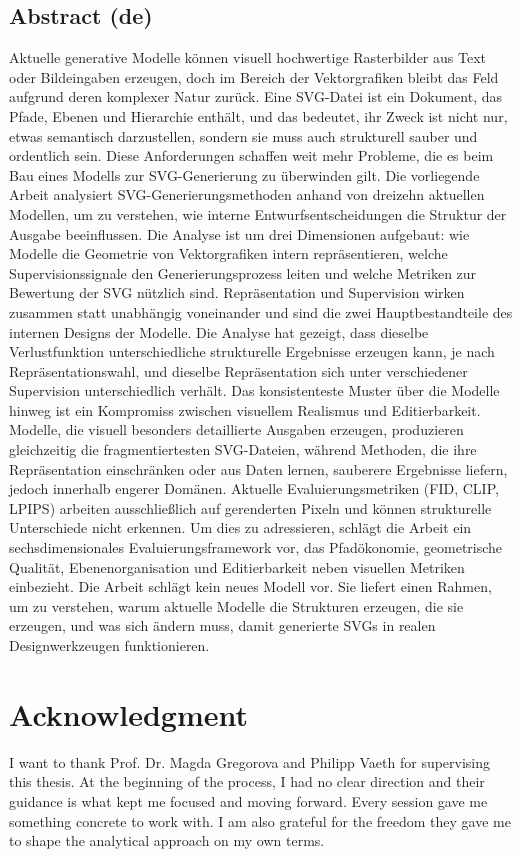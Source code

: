 \section*{Abstract (de)}
Aktuelle generative Modelle können visuell hochwertige Rasterbilder aus Text oder Bildeingaben erzeugen, doch im Bereich der Vektorgrafiken bleibt das Feld aufgrund deren komplexer Natur zurück. Eine SVG-Datei ist ein Dokument, das Pfade, Ebenen und Hierarchie enthält, und das bedeutet, ihr Zweck ist nicht nur, etwas semantisch darzustellen, sondern sie muss auch strukturell sauber und ordentlich sein. Diese Anforderungen schaffen weit mehr Probleme, die es beim Bau eines Modells zur SVG-Generierung zu überwinden gilt. Die vorliegende Arbeit analysiert SVG-Generierungsmethoden anhand von dreizehn aktuellen Modellen, um zu verstehen, wie interne Entwurfsentscheidungen die Struktur der Ausgabe beeinflussen. Die Analyse ist um drei Dimensionen aufgebaut: wie Modelle die Geometrie von Vektorgrafiken intern repräsentieren, welche Supervisionssignale den Generierungsprozess leiten und welche Metriken zur Bewertung der SVG nützlich sind. Repräsentation und Supervision wirken zusammen statt unabhängig voneinander und sind die zwei Hauptbestandteile des internen Designs der Modelle. Die Analyse hat gezeigt, dass dieselbe Verlustfunktion unterschiedliche strukturelle Ergebnisse erzeugen kann, je nach Repräsentationswahl, und dieselbe Repräsentation sich unter verschiedener Supervision unterschiedlich verhält. Das konsistenteste Muster über die Modelle hinweg ist ein Kompromiss zwischen visuellem Realismus und Editierbarkeit. Modelle, die visuell besonders detaillierte Ausgaben erzeugen, produzieren gleichzeitig die fragmentiertesten SVG-Dateien, während Methoden, die ihre Repräsentation einschränken oder aus Daten lernen, sauberere Ergebnisse liefern, jedoch innerhalb engerer Domänen. Aktuelle Evaluierungsmetriken (FID, CLIP, LPIPS) arbeiten ausschließlich auf gerenderten Pixeln und können strukturelle Unterschiede nicht erkennen. Um dies zu adressieren, schlägt die Arbeit ein sechsdimensionales Evaluierungsframework vor, das Pfadökonomie, geometrische Qualität, Ebenenorganisation und Editierbarkeit neben visuellen Metriken einbezieht. Die Arbeit schlägt kein neues Modell vor. Sie liefert einen Rahmen, um zu verstehen, warum aktuelle Modelle die Strukturen erzeugen, die sie erzeugen, und was sich ändern muss, damit generierte SVGs in realen Designwerkzeugen funktionieren.

\newpage
\chapter*{Acknowledgment}
I want to thank Prof. Dr. Magda Gregorova and Philipp Vaeth for supervising this thesis.
At the beginning of the process, I had no clear direction and their guidance 
is what kept me focused and moving forward. 
Every session gave me something concrete to work with. 
I am also grateful for the freedom they gave me to shape the analytical approach on my own terms.

